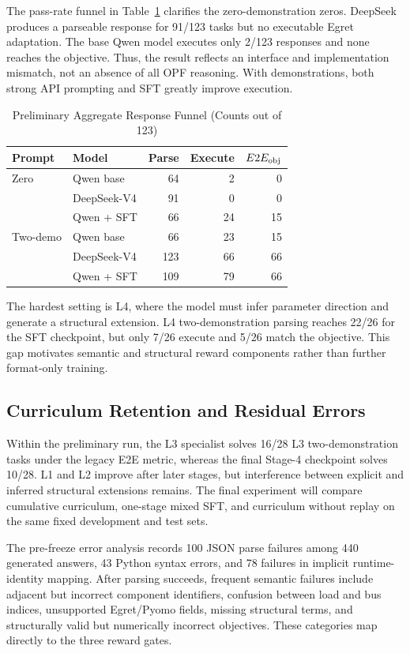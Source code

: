 \documentclass[lettersize,journal]{IEEEtran}
\begin{document}
The pass-rate funnel in Table~\ref{tab:prelim-funnel} clarifies the zero-demonstration zeros. DeepSeek produces a parseable response for 91/123 tasks but no executable Egret adaptation. The base Qwen model executes only 2/123 responses and none reaches the objective. Thus, the result reflects an interface and implementation mismatch, not an absence of all OPF reasoning. With demonstrations, both strong API prompting and SFT greatly improve execution.

\begin{table}[!t]
\caption{Preliminary Aggregate Response Funnel (Counts out of 123)}
\label{tab:prelim-funnel}
\centering
\footnotesize
\setlength{\tabcolsep}{3pt}
\begin{tabular}{@{}llrrr@{}}
\toprule
Prompt & Model & Parse & Execute & $E2E_{\rm obj}$ \\
\midrule
Zero & Qwen base & 64 & 2 & 0 \\
& DeepSeek-V4 & 91 & 0 & 0 \\
& Qwen + SFT & 66 & 24 & 15 \\
\midrule
Two-demo & Qwen base & 66 & 23 & 15 \\
& DeepSeek-V4 & 123 & 66 & 66 \\
& Qwen + SFT & 109 & 79 & 66 \\
\bottomrule
\end{tabular}
\end{table}

The hardest setting is L4, where the model must infer parameter direction and generate a structural extension. L4 two-demonstration parsing reaches 22/26 for the SFT checkpoint, but only 7/26 execute and 5/26 match the objective. This gap motivates semantic and structural reward components rather than further format-only training.

\subsection{Curriculum Retention and Residual Errors}
Within the preliminary run, the L3 specialist solves 16/28 L3 two-demonstration tasks under the legacy E2E metric, whereas the final Stage-4 checkpoint solves 10/28. L1 and L2 improve after later stages, but interference between explicit and inferred structural extensions remains. The final experiment will compare cumulative curriculum, one-stage mixed SFT, and curriculum without replay on the same fixed development and test sets.

The pre-freeze error analysis records 100 JSON parse failures among 440 generated answers, 43 Python syntax errors, and 78 failures in implicit runtime-identity mapping. After parsing succeeds, frequent semantic failures include adjacent but incorrect component identifiers, confusion between load and bus indices, unsupported Egret/Pyomo fields, missing structural terms, and structurally valid but numerically incorrect objectives. These categories map directly to the three reward gates.
\end{document}
